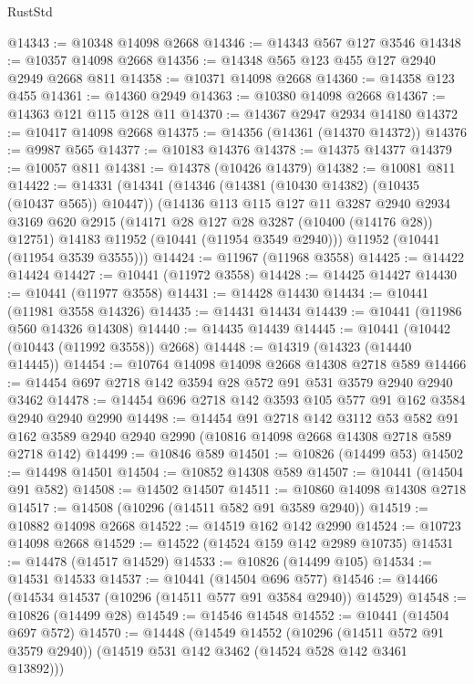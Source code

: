 \begin{lexlean}{RustStd}
\begin{coremodule}
@14343 := @10348 @14098 @2668
@14346 := @14343 @567 @127 @3546
@14348 := @10357 @14098 @2668
@14356 := @14348 @565 @123 @455 @127 @2940 @2949 @2668 @811
@14358 := @10371 @14098 @2668
@14360 := @14358 @123 @455
@14361 := @14360 @2949
@14363 := @10380 @14098 @2668
@14367 := @14363 @121 @115 @128 @11
@14370 := @14367 @2947 @2934 @14180
@14372 := @10417 @14098 @2668
@14375 := @14356 (@14361 (@14370 @14372))
@14376 := @9987 @565
@14377 := @10183 @14376
@14378 := @14375 @14377
@14379 := @10057 @811
@14381 := @14378 (@10426 @14379)
@14382 := @10081 @811
@14422 := @14331
    (@14341
      (@14346 (@14381 (@10430 @14382) (@10435 (@10437 @565)) @10447))
      (@14136
        @113
        @115
        @127
        @11
        @3287
        @2940
        @2934
        @3169
        @620
        @2915
        (@14171 @28 @127 @28 @3287 (@10400 (@14176 @28)) @12751)
        @14183
        @11952
        (@10441 (@11954 @3549 @2940)))
      @11952
      (@10441 (@11954 @3539 @3555)))
@14424 := @11967 (@11968 @3558)
@14425 := @14422 @14424
@14427 := @10441 (@11972 @3558)
@14428 := @14425 @14427
@14430 := @10441 (@11977 @3558)
@14431 := @14428 @14430
@14434 := @10441 (@11981 @3558 @14326)
@14435 := @14431 @14434
@14439 := @10441 (@11986 @560 @14326 @14308)
@14440 := @14435 @14439
@14445 := @10441 (@10442 (@10443 (@11992 @3558)) @2668)
@14448 := @14319 (@14323 (@14440 @14445))
@14454 := @10764 @14098 @14098 @2668 @14308 @2718 @589
@14466 := @14454 @697 @2718 @142 @3594 @28 @572 @91 @531 @3579 @2940 @2940 @3462
@14478 := @14454 @696 @2718 @142 @3593 @105 @577 @91 @162 @3584 @2940 @2940 @2990
@14498 := @14454
    @91
    @2718
    @142
    @3112
    @53
    @582
    @91
    @162
    @3589
    @2940
    @2940
    @2990
    (@10816 @14098 @2668 @14308 @2718 @589 @2718 @142)
@14499 := @10846 @589
@14501 := @10826 (@14499 @53)
@14502 := @14498 @14501
@14504 := @10852 @14308 @589
@14507 := @10441 (@14504 @91 @582)
@14508 := @14502 @14507
@14511 := @10860 @14098 @14308 @2718
@14517 := @14508 (@10296 (@14511 @582 @91 @3589 @2940))
@14519 := @10882 @14098 @2668
@14522 := @14519 @162 @142 @2990
@14524 := @10723 @14098 @2668
@14529 := @14522 (@14524 @159 @142 @2989 @10735)
@14531 := @14478 (@14517 @14529)
@14533 := @10826 (@14499 @105)
@14534 := @14531 @14533
@14537 := @10441 (@14504 @696 @577)
@14546 := @14466 (@14534 @14537 (@10296 (@14511 @577 @91 @3584 @2940)) @14529)
@14548 := @10826 (@14499 @28)
@14549 := @14546 @14548
@14552 := @10441 (@14504 @697 @572)
@14570 := @14448
    (@14549
      @14552
      (@10296 (@14511 @572 @91 @3579 @2940))
      (@14519 @531 @142 @3462 (@14524 @528 @142 @3461 @13892)))

\end{coremodule}
\end{lexlean}
